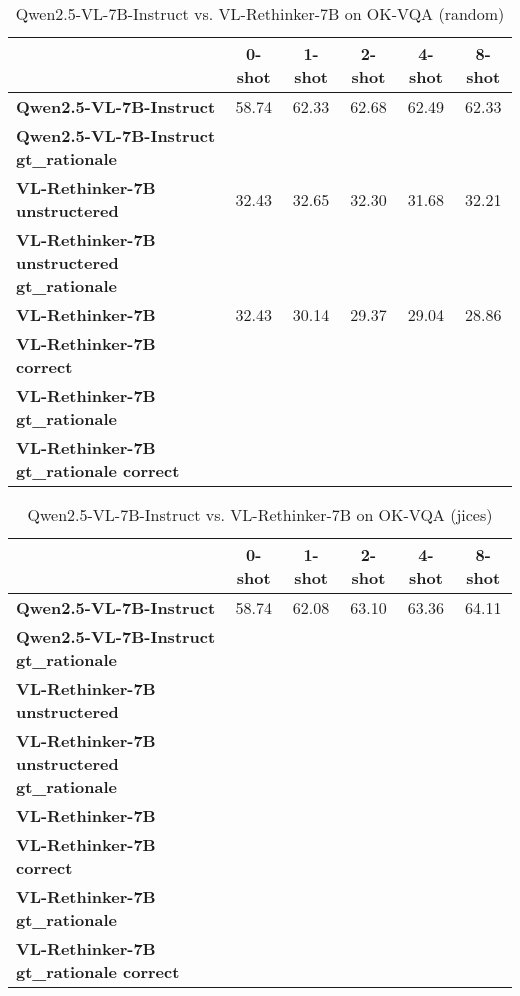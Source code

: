 \begin{table}
\caption{Qwen2.5-VL-7B-Instruct vs. VL-Rethinker-7B on OK-VQA (random)}
\label{tab:Qwen2.5-VL-7B-Instruct_OK-VQA_TRAIN_random}
\begin{tabular}{lccccc}
\toprule
 & 0-shot & 1-shot & 2-shot & 4-shot & 8-shot \\
\midrule
\textbf{Qwen2.5-VL-7B-Instruct} & 58.74 & 62.33 & 62.68 & 62.49 & 62.33 \\
\textbf{Qwen2.5-VL-7B-Instruct gt\_rationale} &  &  &  &  &  \\
\textbf{VL-Rethinker-7B unstructered} & 32.43 & 32.65 & 32.30 & 31.68 & 32.21 \\
\textbf{VL-Rethinker-7B unstructered gt\_rationale} &  &  &  &  &  \\
\textbf{VL-Rethinker-7B} & 32.43 & 30.14 & 29.37 & 29.04 & 28.86 \\
\textbf{VL-Rethinker-7B correct} &  &  &  &  &  \\
\textbf{VL-Rethinker-7B gt\_rationale} &  &  &  &  &  \\
\textbf{VL-Rethinker-7B gt\_rationale correct} &  &  &  &  &  \\
\bottomrule
\end{tabular}
\end{table}


\begin{table}
\caption{Qwen2.5-VL-7B-Instruct vs. VL-Rethinker-7B on OK-VQA (jices)}
\label{tab:Qwen2.5-VL-7B-Instruct_OK-VQA_TRAIN_jices}
\begin{tabular}{lccccc}
\toprule
 & 0-shot & 1-shot & 2-shot & 4-shot & 8-shot \\
\midrule
\textbf{Qwen2.5-VL-7B-Instruct} & 58.74 & 62.08 & 63.10 & 63.36 & 64.11 \\
\textbf{Qwen2.5-VL-7B-Instruct gt\_rationale} &  &  &  &  &  \\
\textbf{VL-Rethinker-7B unstructered} &  &  &  &  &  \\
\textbf{VL-Rethinker-7B unstructered gt\_rationale} &  &  &  &  &  \\
\textbf{VL-Rethinker-7B} &  &  &  &  &  \\
\textbf{VL-Rethinker-7B correct} &  &  &  &  &  \\
\textbf{VL-Rethinker-7B gt\_rationale} &  &  &  &  &  \\
\textbf{VL-Rethinker-7B gt\_rationale correct} &  &  &  &  &  \\
\bottomrule
\end{tabular}
\end{table}


